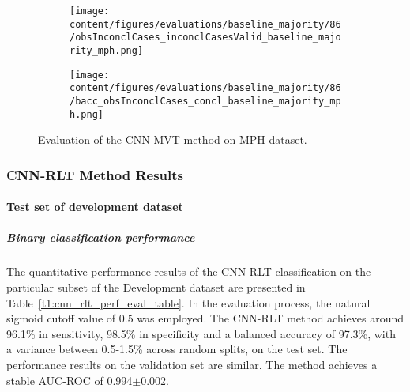 \begin{figure}[ht]
  \begin{subfigure}{0.9\textwidth}
    \centering
    \texttt{[image: content/figures/evaluations/baseline\_majority/86/obsInconclCases\_inconclCasesValid\_baseline\_majority\_mph.png]}
    \label{fig:obsInconclCases_inconclCasesValid_baseline_majority_mph}
  \end{subfigure}
  \hfill
  \begin{subfigure}{0.9\textwidth}
    \centering
    \texttt{[image: content/figures/evaluations/baseline\_majority/86/bacc\_obsInconclCases\_concl\_baseline\_majority\_mph.png]}
    \label{fig:bacc_obsInconclCases_concl_baseline_majority_mph}
  \end{subfigure}
  \caption{Evaluation of the CNN-MVT method on MPH dataset.}
  \label{fig:perf_results_mvt_mph}
\end{figure}


\subsubsection{CNN-RLT Method Results}
\label{subsubsec:eval_rlt}


\paragraph{Test set of development dataset}


\subparagraph{Binary classification performance}

The quantitative performance results of the CNN-RLT classification on the 
particular subset of the Development dataset are presented in Table~\ref{t1:cnn_rlt_perf_eval_table}.
In the evaluation process, the natural sigmoid cutoff value of $0.5$ was employed.
The CNN-RLT method achieves around 96.1\% in sensitivity, 98.5\% in specificity and a balanced accuracy of 97.3\%, 
with a variance between 0.5-1.5\% across random splits, on the test set.
The performance results on the validation set are similar.
The method achieves a stable AUC-ROC of 0.994$\pm$0.002.


